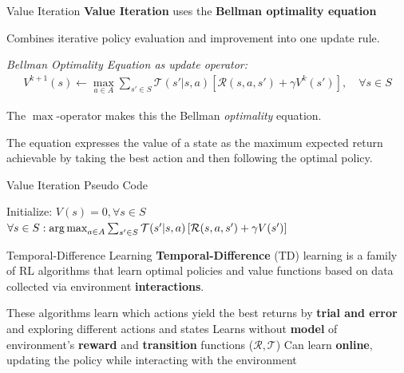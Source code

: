 \begin{frame}{Value Iteration}
	\textbf{Value Iteration} uses the \textbf{Bellman optimality equation}
    \blist
        \item Combines iterative policy evaluation and improvement into one update rule.
    \elist

    \textit{Bellman Optimality Equation as update operator:}
    \begin{align*}
        V^{k+1}(s) \gets \max_{a \in A} \sum_{s' \in S} \mathcal{T}(s' | s, a) [\mathcal{R}(s, a, s') + \gamma V^k(s')], \quad \forall s \in S
    \end{align*}

    \blist
        \item The $\max$-operator makes this the Bellman \textit{optimality} equation.
        \item The equation expresses the value of a state as the maximum expected return achievable by taking the best action and then following the optimal policy.
    \elist
\end{frame}

\begin{frame}[fragile]{Value Iteration Pseudo Code}

        \State Initialize: $V(s) = 0, \forall s \in S$
        \Repeat
            \State {}
        \State $\forall s \in S: \operatorname*{arg\,max}_{a \in A} \sum_{s' \in S}\mathcal{T}(s'|s, a)\left[\mathcal{R}(s, a, s')+\gamma V(s') \right]$
    \ealg

\end{frame}

\begin{frame}{Temporal-Difference Learning}
    \textbf{Temporal-Difference} (TD) learning is a family of RL algorithms that learn optimal policies and value functions based on data collected via environment \textbf{interactions}. 

    \blist
        \item These algorithms learn which actions yield the best returns by 
        \textbf{trial and error} and exploring different actions and states
    	\listtab Learns without \textbf{model} of environment's \textbf{reward} and \textbf{transition} functions ($\mathcal{R}, \mathcal{T}$)
        \listtab Can learn \textbf{online}, updating the policy while interacting with the environment
    \elist
\end{frame}

